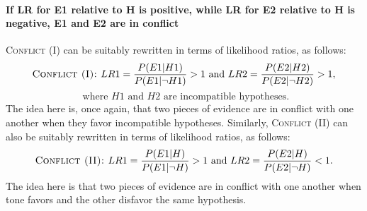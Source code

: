 \documentclass[10pt]{article}
\begin{document}
\paragraph{If LR for E1 relative to H is positive, while LR for E2 relative to H is negative, E1 and E2 are in conflict}

\textsc{Conflict (I)}  can be suitably rewritten in terms of 
likelihood ratios, as follows:
%
\[\textsc{Conflict (I): } LR1=\frac{P(E1| H1)}{P(E1|\neg H1)}>1 \text{ and } LR2=\frac{P(E2|H2)}{P(E2|\neg H2)}>1,\] 
%
\[\text{ where  $H1$ and $H2$ are incompatible hypotheses}.\]
%
The idea here is, once again, that two pieces of evidence are in conflict with one another 
when they favor incompatible hypotheses.  Similarly, \textsc{Conflict (II)}  can also be suitably rewritten in terms of 
likelihood ratios, as follows:
%
\[\textsc{Conflict (II): } LR1=\frac{P(E1| H)}{P(E1|\neg H)}>1 \text{ and } LR2=\frac{P(E2|H)}{P(E2|\neg H)}<1.\]
%
The idea here is that two pieces of evidence are in conflict with one another 
when tone favors and the other disfavor the same hypothesis. 
\end{document}
